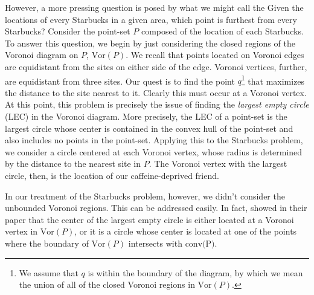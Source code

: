 \documentclass[12pt,twoside]{reedthesis}
\begin{document}
    However, a more pressing question is posed by what we might call the  Given the locations of every Starbucks in a given area, which point is furthest from every Starbucks? Consider the point-set $P$ composed of the location of each Starbucks. To answer this question, we begin by just considering the closed regions of the Voronoi diagram on $P$, $\mbox{Vor}(P)$. We recall that points located on Voronoi edges are equidistant from the sites on either side of the edge. Voronoi vertices, further, are equidistant from three sites. Our quest is to find the point $q$\footnote{We assume that $q$ is within the boundary of the diagram, by which we mean the union of all of the closed Voronoi regions in $\mbox{Vor}(P)$.} that maximizes the distance to the site nearest to it. Clearly this must occur at a Voronoi vertex. At this point, this problem is precisely the issue of finding the \emph{largest empty circle} (LEC) in the Voronoi diagram. More precisely, the LEC of a point-set is the largest circle whose center is contained in the convex hull of the point-set and also includes no points in the point-set. Applying this to the Starbucks problem, we consider a circle centered at each Voronoi vertex, whose radius is determined by the distance to the nearest site in $P$. The Voronoi vertex with the largest circle, then, is the location of our caffeine-deprived friend. \par

    In our treatment of the Starbucks problem, however, we didn't consider the unbounded Voronoi regions. This can be addressed easily. In fact, \textcite{shamos_hoey} showed in their \citeyear{shamos_hoey} paper that the center of the largest empty circle is either located at a Voronoi vertex in $\mbox{Vor}(P)$, or it is a circle whose center is located at one of the points where the boundary of $\mbox{Vor}(P)$ intersects with $\mbox{conv(P)}$. 
\end{document}
